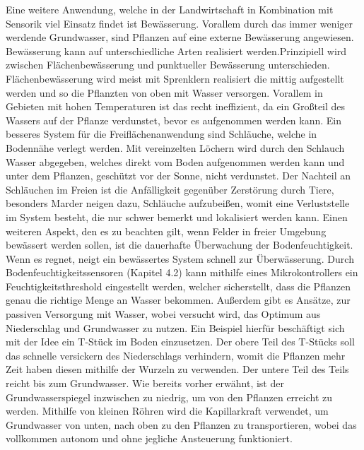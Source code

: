 Eine weitere Anwendung, welche in der Landwirtschaft in Kombination mit
Sensorik viel Einsatz findet ist Bewässerung. Vorallem durch das immer weniger
werdende Grundwasser, sind Pflanzen auf eine externe Bewässerung
angewiesen.\cite{liu2018self} Bewässerung kann auf unterschiedliche Arten
realisiert werden.Prinzipiell wird zwischen Flächenbewässerung und
punktueller Bewässerung unterschieden. Flächenbewässerung wird meist mit Sprenklern
realisiert die mittig aufgestellt werden und so die Pflanzten von oben mit
Wasser versorgen. Vorallem in Gebieten mit hohen Temperaturen ist das recht ineffizient,
da ein Großteil des Wassers auf der Pflanze verdunstet, bevor es aufgenommen
werden kann. Ein besseres System für die Freiflächenanwendung sind
Schläuche, welche in Bodennähe verlegt werden. Mit vereinzelten Löchern wird
durch den Schlauch Wasser abgegeben, welches direkt vom Boden aufgenommen
werden kann und unter dem Pflanzen, geschützt vor der Sonne, nicht verdunstet.
Der Nachteil an Schläuchen im Freien ist die Anfälligkeit gegenüber Zerstörung
durch Tiere, besonders Marder neigen dazu, Schläuche aufzubeißen, womit eine
Verluststelle im System besteht, die nur schwer bemerkt und lokalisiert werden
kann. Einen weiteren Aspekt, den es zu beachten gilt, wenn Felder in freier
Umgebung bewässert werden sollen, ist die dauerhafte Überwachung der
Bodenfeuchtigkeit. Wenn es regnet, neigt ein bewässertes System schnell zur
Überwässerung. Durch Bodenfeuchtigkeitssensoren (Kapitel 4.2) kann mithilfe
eines Mikrokontrollers ein Feuchtigkeitsthreshold eingestellt werden, welcher
sicherstellt, dass die Pflanzen genau die richtige Menge an Wasser bekommen.
Außerdem gibt es Ansätze, zur passiven Versorgung mit Wasser, wobei versucht wird, das Optimum aus Niederschlag und Grundwasser zu nutzen. Ein Beispiel
hierfür beschäftigt sich mit der Idee ein T-Stück im Boden einzusetzen. Der
obere Teil des T-Stücks soll das schnelle versickern des Niederschlags
verhindern, womit die Pflanzen mehr Zeit haben diesen mithilfe der Wurzeln zu
verwenden. Der untere Teil des Teils reicht bis zum Grundwasser. Wie bereits
vorher erwähnt, ist der Grundwasserspiegel inzwischen zu niedrig, um von den
Pflanzen erreicht zu werden. Mithilfe von kleinen Röhren wird die Kapillarkraft
verwendet, um Grundwasser von unten, nach oben zu den Pflanzen zu
transportieren, wobei das vollkommen autonom und ohne jegliche Ansteuerung
funktioniert.\cite{liu2018self}

